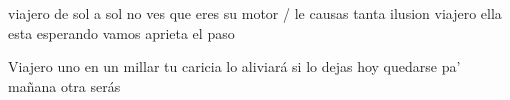 \endverse

\beginverse
    viajero de sol a sol
    no ves que eres su motor / le causas tanta ilusion
    viajero ella esta esperando
    vamos aprieta el paso
\endverse

\beginverse
    Viajero uno en un millar
    tu caricia lo aliviará
    si lo dejas hoy quedarse
    pa' mañana otra serás
\endverse

